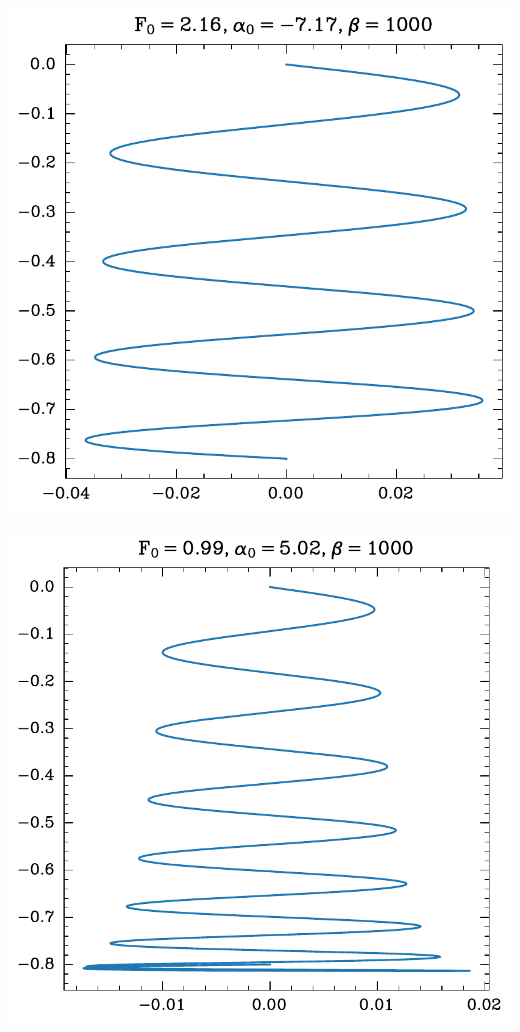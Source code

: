 \begin{center}
    \begin{minipage}{0.5\textwidth}
        \centering
    \includegraphics[width=\textwidth]{../images/2024-1-trajektorija2.pdf}
    \end{minipage}\hfill
    \begin{minipage}{0.5\textwidth}
        \centering
        \includegraphics[width=1\textwidth]{../images/2024-1-trajektorija1.pdf}
    \end{minipage}
\end{center}



